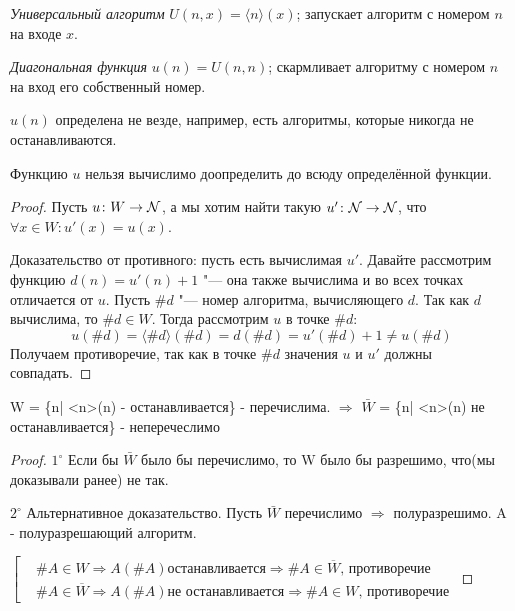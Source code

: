 \begin{Def}
	\textit{Универсальный алгоритм} $U(n, x) = \langle n \rangle (x)$; запускает алгоритм с номером $n$ на входе $x$.
\end{Def}
\begin{Def}
	\textit{Диагональная функция} $u(n) = U(n, n)$; скармливает алгоритму с номером $n$ на вход его собственный номер.
\end{Def}
\begin{Rem}
	$u(n)$ определена не везде, например, есть алгоритмы, которые никогда не останавливаются.
\end{Rem}

\begin{theorem}
	Функцию $u$ нельзя вычислимо доопределить до всюду определённой функции.
\end{theorem}
\begin{proof}
	Пусть $u \colon W \to \mathcal{N}$, а мы хотим найти такую $u' \colon \mathcal{N} \to \mathcal{N}$, что $\forall x \in W \colon u'(x)=u(x)$.

	Доказательство от противного: пусть есть вычислимая $u'$.
	Давайте рассмотрим функцию $d(n)=u'(n)+1$ "--- она также вычислима и во всех точках отличается от $u$.
	Пусть $\#d$ "--- номер алгоритма, вычисляющего $d$.
	Так как $d$ вычислима, то $\#d \in W$.
	Тогда рассмотрим $u$ в точке $\#d$:
	\[ u(\#d) = \langle \#d \rangle (\#d) = d(\#d) = u'(\#d) + 1 \neq u(\#d) \]
	Получаем противоречие, так как в точке $\#d$ значения $u$ и $u'$ должны совпадать.
\end{proof}


W = \{n| <n>(n) - останавливается\} - перечислима. $\Rightarrow$ $\bar{W}$ = \{n| <n>(n) не останавливается\} - неперечеслимо
\begin{proof}
	$1^{\circ}$ Если бы $\bar{W}$ было бы перечислимо, то W было бы разрешимо, что(мы доказывали ранее) не так.

	$2^{\circ}$ Альтернативное доказательство. Пусть $\bar{W}$ перечислимо $\Rightarrow$ полуразрешимо. A - полуразрешающий алгоритм.


	$\left[
		\begin{aligned}
		&\#A \in W \Rightarrow A(\#A) \text{останавливается} \Rightarrow \#A \in \overline{W}\text{, противоречие} \\
		&\#A \in \overline{W} \Rightarrow A(\#A) \text{не останавливается} \Rightarrow \#A \in W\text{, противоречие}
		\end{aligned}
	\right.$

\end{proof}


